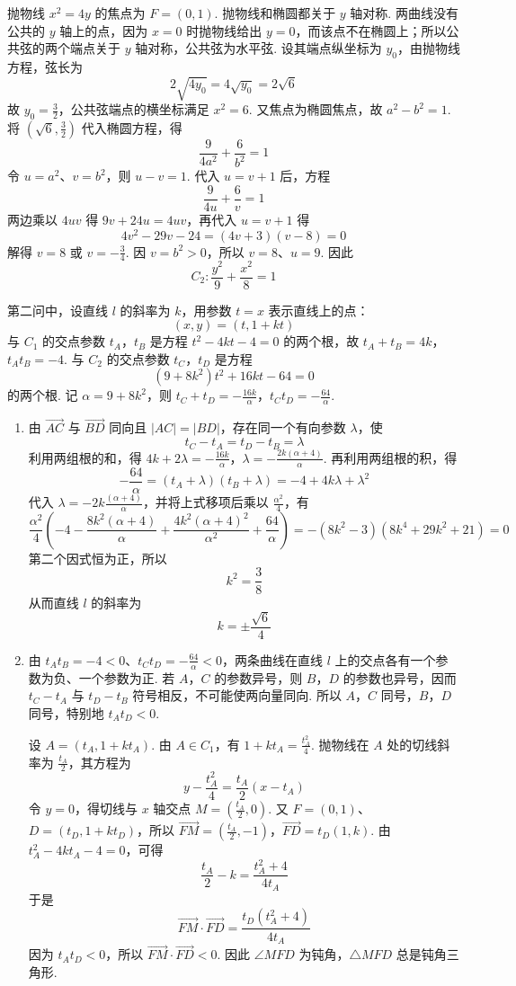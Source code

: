 \begin{solution}
抛物线 \(x^2=4y\) 的焦点为 \(F=(0,1)\). 抛物线和椭圆都关于 \(y\) 轴对称. 两曲线没有公共的 \(y\) 轴上的点，因为 \(x=0\) 时抛物线给出 \(y=0\)，而该点不在椭圆上；所以公共弦的两个端点关于 \(y\) 轴对称，公共弦为水平弦. 设其端点纵坐标为 \(y_0\)，由抛物线方程，弦长为
\[
2\sqrt{4y_0}=4\sqrt{y_0}=2\sqrt6
\]
故 \(y_0=\frac{3}{2}\)，公共弦端点的横坐标满足 \(x^2=6\). 又焦点为椭圆焦点，故 \(a^2-b^2=1\). 将 \((\sqrt6,\frac{3}{2})\) 代入椭圆方程，得
\[
\frac{9}{4a^2}+\frac6{b^2}=1
\]
令 \(u=a^2\)、\(v=b^2\)，则 \(u-v=1\). 代入 \(u=v+1\) 后，方程
\[
\frac{9}{4u}+\frac6v=1
\]
两边乘以 \(4uv\) 得 \(9v+24u=4uv\)，再代入 \(u=v+1\) 得
\[
4v^2-29v-24=(4v+3)(v-8)=0
\]
解得 \(v=8\) 或 \(v=-\frac34\). 因 \(v=b^2>0\)，所以 \(v=8\)、\(u=9\). 因此
\[
C_2:\frac{y^2}{9}+\frac{x^2}{8}=1
\]

第二问中，设直线 \(l\) 的斜率为 \(k\)，用参数 \(t=x\) 表示直线上的点：
\[
(x,y)=(t,1+kt)
\]
与 \(C_1\) 的交点参数 \(t_A\)，\(t_B\) 是方程 \(t^2-4kt-4=0\) 的两个根，故
\(t_A+t_B=4k\)，\(t_At_B=-4\).
与 \(C_2\) 的交点参数 \(t_C\)，\(t_D\) 是方程
\[
(9+8k^2)t^2+16kt-64=0
\]
的两个根. 记 \(\alpha=9+8k^2\)，则
\(t_C+t_D=-\frac{16k}{\alpha}\)，\(t_Ct_D=-\frac{64}{\alpha}\).

\begin{enumerate}
\item 由 \(\overrightarrow{AC}\) 与 \(\overrightarrow{BD}\) 同向且 \(|AC|=|BD|\)，存在同一个有向参数 \(\lambda\)，使
\[
t_C-t_A=t_D-t_B=\lambda
\]
利用两组根的和，得
\(4k+2\lambda=-\frac{16k}{\alpha}\)，\(\lambda=-\frac{2k(\alpha+4)}{\alpha}\).
再利用两组根的积，得
\[
-\frac{64}{\alpha}=(t_A+\lambda)(t_B+\lambda)=-4+4k\lambda+\lambda^2
\]
代入 \(\lambda=-2k\frac{(\alpha+4)}{\alpha}\)，并将上式移项后乘以 \(\frac{\alpha^2}{4}\)，有
\[
\frac{\alpha^2}{4}\left(
-4-\frac{8k^2(\alpha+4)}{\alpha}
+\frac{4k^2(\alpha+4)^2}{\alpha^2}
+\frac{64}{\alpha}\right)
=-(8k^2-3)(8k^4+29k^2+21)=0
\]
第二个因式恒为正，所以
\[
k^2=\frac38
\]
从而直线 \(l\) 的斜率为
\[
k=\pm\frac{\sqrt6}{4}
\]

\item 由 \(t_At_B=-4<0\)、\(t_Ct_D=-\frac{64}{\alpha}<0\)，两条曲线在直线 \(l\) 上的交点各有一个参数为负、一个参数为正. 若 \(A\)，\(C\) 的参数异号，则 \(B\)，\(D\) 的参数也异号，因而 \(t_C-t_A\) 与 \(t_D-t_B\) 符号相反，不可能使两向量同向. 所以 \(A\)，\(C\) 同号，\(B\)，\(D\) 同号，特别地 \(t_A t_D<0\).

设 \(A=(t_A,1+kt_A)\). 由 \(A\in C_1\)，有 \(1+kt_A=\frac{t_A^2}{4}\). 抛物线在 \(A\) 处的切线斜率为 \(\frac{t_A}{2}\)，其方程为
\[
y-\frac{t_A^2}{4}=\frac{t_A}{2}(x-t_A)
\]
令 \(y=0\)，得切线与 \(x\) 轴交点 \(M=(\frac{t_A}{2},0)\). 又 \(F=(0,1)\)、\(D=(t_D,1+kt_D)\)，所以
\(\overrightarrow{FM}=\left(\frac{t_A}{2},-1\right)\)，\(\overrightarrow{FD}=t_D(1,k)\).
由 \(t_A^2-4kt_A-4=0\)，可得
\[
\frac{t_A}{2}-k=\frac{t_A^2+4}{4t_A}
\]
于是
\[
\overrightarrow{FM}\cdot\overrightarrow{FD}
=\frac{t_D(t_A^2+4)}{4t_A}
\]
因为 \(t_A t_D<0\)，所以 \(\overrightarrow{FM}\cdot\overrightarrow{FD}<0\). 因此 \(\angle MFD\) 为钝角，\(\triangle MFD\) 总是钝角三角形.
\end{enumerate}
\end{solution}

